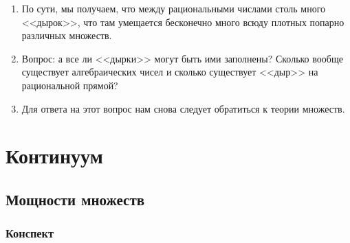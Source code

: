 \begin{enumerate}
\item По сути, мы получаем, что между рациональными числами столь много <<дырок>>, что там умещается бесконечно много всюду плотных попарно различных множеств.
\item Вопрос: а все ли <<дырки>> могут быть ими заполнены? Сколько вообще существует алгебраических чисел и сколько существует <<дыр>> на рациональной прямой?
\item Для ответа на этот вопрос нам снова следует обратиться к теории множеств.
\end{enumerate}


\chapter{Континуум}



\section{Мощности множеств}

\subsection*{Конспект}

